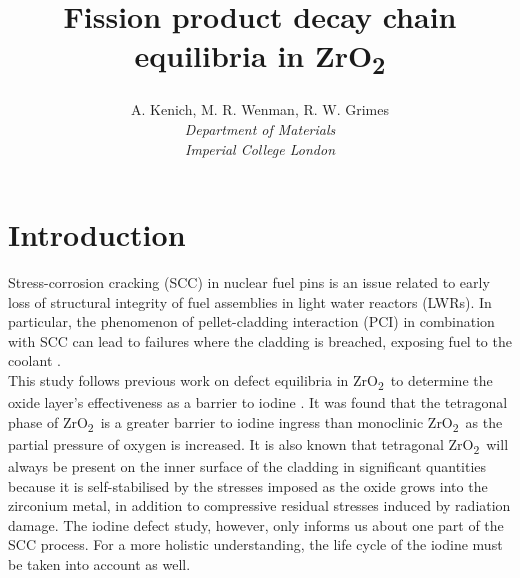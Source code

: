 \documentclass[11pt,a4paper]{article}
\newcommand{\zirconia}{ZrO\textsubscript{2}}
\begin{document}
\title{Fission product decay chain equilibria in \zirconia}
\author{A. Kenich, M. R. Wenman, R. W. Grimes\\ \emph{Department of Materials} \\ \emph{Imperial College London}}

\maketitle




\section{Introduction}

Stress-corrosion cracking (SCC) in nuclear fuel pins is an issue related to early loss of structural integrity of fuel assemblies in light water reactors (LWRs). In particular, the phenomenon of pellet-cladding interaction (PCI) in combination with SCC can lead to failures where the cladding is breached, exposing fuel to the coolant \cite{Cox1990}.     \\

This study follows previous work on defect equilibria in \zirconia\ to determine the oxide layer's effectiveness as a barrier to iodine \cite{kenichiodine2018}. It was found that the tetragonal phase of \zirconia\ is a greater barrier to iodine ingress than monoclinic \zirconia\ as the partial pressure of oxygen is increased. It is also known that tetragonal \zirconia\ will always be present on the inner surface of the cladding in significant quantities because it is self-stabilised by the stresses imposed as the oxide grows into the zirconium metal, in addition to compressive residual stresses induced by radiation damage. The iodine defect study, however, only informs us about one part of the SCC process. For a more holistic understanding, the life cycle of the iodine must be taken into account as well.     \\

\end{document}
